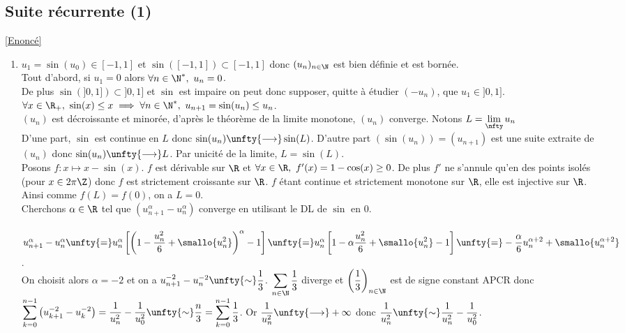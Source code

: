 \documentclass{book}
\begin{document}
	\subsection{Suite récurrente (1) }\label{sec:suite-recurrente-1-etoile3}
	\textcolor{blue}{\hyperref[Suite récurrente 1]{[Enoncé]}}\\
	\begin{enumerate}
		\item $u_1=\sin(u_0)\in [-1,1]$ et $\sin([-1,1])\subset [-1,1]$ donc $(u_n)_{n\in \N}$ est bien définie et est bornée. \\Tout d'abord, si $u_1=0$ alors $\forall n\in \N^*,\ u_n=0$.\\
		De plus $\sin(]0,1])\subset ]0,1]$ et $\sin$ est impaire on peut donc supposer, quitte à étudier $(-u_n)$, que $u_1\in ]0,1]$.\\
		$\forall x\in \R_+,\ \sin(x)\leq x\implies \forall n\in \N^*,\ u_{n+1}=\sin(u_n)\leq u_n$.\\
		$(u_n)$ est décroissante et minorée, d'après le théorème de la limite monotone, $(u_n)$ converge. Notons $L=\lim\limits_{\nfty} u_n$\\
		D'une part, $\sin$ est continue en $L$ donc $\sin(u_n)\unfty{\longrightarrow} \sin(L)$. D'autre part $(\sin(u_n))=(u_{n+1})$ est une suite extraite de $(u_n)$ donc $\sin(u_n)\unfty{\longrightarrow} L$. Par unicité de la limite, $L=\sin(L)$.\\
		Posons $f:x\mapsto x-\sin(x)$. $f$ est dérivable sur $\R$ et $\forall x\in \R,\ f'(x)=1-\cos(x)\geq 0$. De plus $f'$ ne s'annule qu'en des points isolés (pour $x\in 2\pi\Z$) donc $f$ est strictement croissante sur $\R$. $f$ étant continue et strictement monotone sur $\R$, elle est injective sur $\R$. Ainsi comme $f(L)=f(0)$, on a $L=0$.\\
		Cherchons $\alpha\in \R$ tel que $(u_{n+1}^\alpha-u_n^\alpha)$ converge en utilisant le DL de $\sin$ en $0$.\\\\
		$u_{n+1}^\alpha-u_n^\alpha\unfty{=}u_n^\alpha\left[\left(1-\displaystyle\frac{u_n^2}{6}+\smallo{u_n^2}\right)^\alpha-1\right]\unfty{=}u_n^\alpha\left[1-\alpha\displaystyle\frac{u_n^2}{6}+\smallo{u_n^2}-1\right]\unfty{=}-\displaystyle\frac{\alpha}{6}u_n^{\alpha+2}+\smallo{u_n^{\alpha+2}}$.\\
		On choisit alors $\alpha=-2$ et on a $u_{n+1}^{-2}-u_n^{-2}\unfty{\sim}\displaystyle\frac{1}{3}$. $\displaystyle\sum\limits_{n\in \N}\frac{1}{3}$ diverge et $\left(\displaystyle\frac{1}{3}\right)_{n\in \N}$ est de signe constant APCR donc $\displaystyle\sum\limits_{k=0}^{n-1}\left(u_{k+1}^{-2}-u_k^{-2}\right)=\displaystyle\frac{1}{u_n^2}-\displaystyle\frac{1}{u_0^2}\unfty{\sim}\displaystyle\frac{n}{3}=\displaystyle\sum\limits_{k=0}^{n-1}\frac{1}{3}$. Or $\displaystyle\frac{1}{u_n^2}\unfty{\longrightarrow}+\infty$ donc $\displaystyle\frac{1}{u_n^2}\unfty{\sim}\displaystyle\frac{1}{u_n^2}-\displaystyle\frac{1}{u_0^2}$.\\

\end{enumerate}
\end{document}
